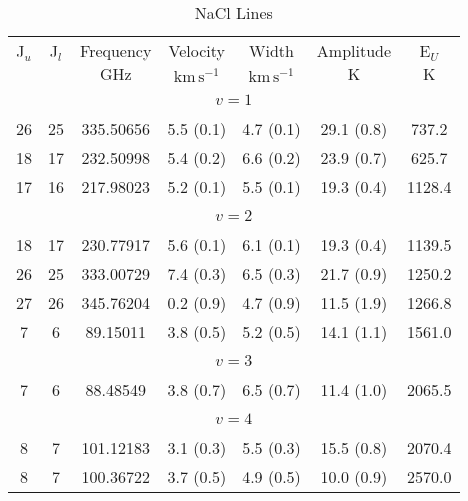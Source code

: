 \begin{table*}[htp]
\centering
\caption{NaCl Lines}
\begin{tabular}{ccccccc}
\label{tab:NaCl_salt_lines}
 J$_u$ & J$_l$ & Frequency & Velocity & Width & Amplitude & E$_U$ \\
  &  & $\mathrm{GHz}$ & $\mathrm{km\,s^{-1}}$ & $\mathrm{km\,s^{-1}}$ & $\mathrm{K}$ & $\mathrm{K}$ \\
\hline
&\vspace{-0.75em}\\
\multicolumn{7}{c}{$v = 1$} \\
\vspace{-0.75em}\\
 26 & 25 & 335.50656 & 5.5 (0.1) & 4.7 (0.1) & 29.1 (0.8) & 737.2 \\
 18 & 17 & 232.50998 & 5.4 (0.2) & 6.6 (0.2) & 23.9 (0.7) & 625.7 \\
 17 & 16 & 217.98023 & 5.2 (0.1) & 5.5 (0.1) & 19.3 (0.4) & 1128.4 \\
&\vspace{-0.75em}\\
\multicolumn{7}{c}{$v = 2$} \\
\vspace{-0.75em}\\
 18 & 17 & 230.77917 & 5.6 (0.1) & 6.1 (0.1) & 19.3 (0.4) & 1139.5 \\
 26 & 25 & 333.00729 & 7.4 (0.3) & 6.5 (0.3) & 21.7 (0.9) & 1250.2 \\
 27 & 26 & 345.76204 & 0.2 (0.9) & 4.7 (0.9) & 11.5 (1.9) & 1266.8 \\
 7 & 6 & 89.15011 & 3.8 (0.5) & 5.2 (0.5) & 14.1 (1.1) & 1561.0 \\
&\vspace{-0.75em}\\
\multicolumn{7}{c}{$v = 3$} \\
\vspace{-0.75em}\\
 7 & 6 & 88.48549 & 3.8 (0.7) & 6.5 (0.7) & 11.4 (1.0) & 2065.5 \\
&\vspace{-0.75em}\\
\multicolumn{7}{c}{$v = 4$} \\
\vspace{-0.75em}\\
 8 & 7 & 101.12183 & 3.1 (0.3) & 5.5 (0.3) & 15.5 (0.8) & 2070.4 \\
 8 & 7 & 100.36722 & 3.7 (0.5) & 4.9 (0.5) & 10.0 (0.9) & 2570.0 \\

\end{tabular}
\end{table*}
